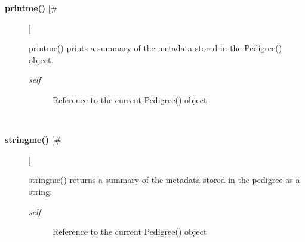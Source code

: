 \begin{description}
\item[\textbf{printme()} [\#]
]
\par printme() prints a summary of the metadata stored in the Pedigree() object.
\begin{description}
\item[\textit{self}
]
Reference to the current Pedigree() object
\end{description}\\

\item[\textbf{stringme()} [\#]
]
\par stringme() returns a summary of the metadata stored in the pedigree as
a string.
\begin{description}
\item[\textit{self}
]
Reference to the current Pedigree() object
\end{description}\\

\end{description}
